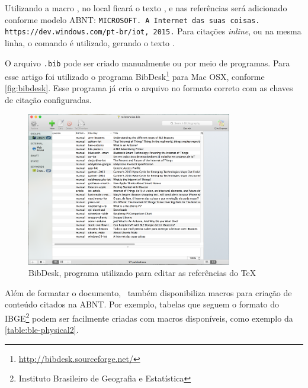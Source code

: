 Utilizando a macro \texttt{}, no local ficará o texto \cite{windows10-iot}, e nas referências será adicionado conforme modelo ABNT: \texttt{MICROSOFT. A Internet das suas coisas. https://dev.windows.com/pt-br/iot, 2015.} Para citações \textit{inline}, ou na mesma linha, o comando \texttt{} é utilizado, gerando o texto .

O arquivo \texttt{.bib} pode ser criado manualmente ou por meio de programas. Para esse artigo foi utilizado o programa BibDesk\footnote{\url{http://bibdesk.sourceforge.net/}} para Mac OSX, conforme \autoref{fig:bibdesk}. Esse programa já cria o arquivo no formato correto com as chaves de citação configuradas.

\begin{figure}[htb]
	\caption{\label{fig:bibdesk}BibDesk, programa utilizado para editar as referências do TeX}
	\begin{center}
		\includegraphics[width=0.8\textwidth]{img/bibdesk.png}
	\end{center}
\end{figure}

Além de formatar o documento, \abnTeX\ também disponibiliza macros para criação de conteúdo citados na ABNT. Por exemplo, tabelas que seguem o formato do IBGE\footnote{Instituto Brasileiro de Geografia e Estatística} podem ser facilmente criadas com macros disponíveis, como exemplo da \autoref{table:ble-physical2}.

